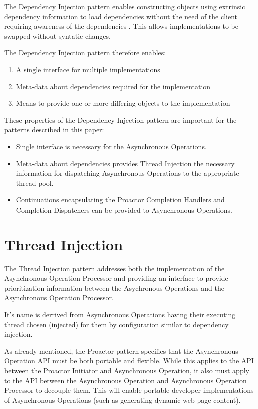 \documentclass{article}
\begin{document}
The Dependency Injection pattern enables constructing objects using extrinsic
dependency information to load dependencies without the need of the client
requiring awareness of the dependencies \cite{ioc}.  This allows implementations
to be swapped without syntatic changes.

The Dependency Injection pattern therefore enables:
\begin{enumerate}
  \item A single interface for multiple implementations
  \item Meta-data about dependencies required for the implementation
  \item Means to provide one or more differing objects to the implementation
\end{enumerate}

These properties of the Dependency Injection pattern are important for the
patterns described in this paper:
\begin{itemize}
  \item Single interface is necessary for the Asynchronous Operations.
  \item Meta-data about dependencies provides Thread Injection the necessary information for dispatching Asynchronous Operations to the appropriate thread pool.
  \item Continuations encapsulating the Proactor Completion Handlers and Completion Dispatchers can be provided to Asynchronous Operations.
\end{itemize}

\section{Thread Injection}

The Thread Injection pattern addresses both the implementation of the
Asynchronous Operation Processor and providing an interface to provide
prioritization information between the Asychronous Operations and the
Asynchronous Operation Processor.

It's name is derrived from Asynchronous Operations having their executing thread
chosen (injected) for them by configuration similar to dependency injection.

As already mentioned, the Proactor pattern specifies that the Asynchronous
Operation API must be both portable and flexible.  While this applies to the API
between the Proactor Initiator and Asynchronous Operation, it also must apply to
the API between the Asynchronous Operation and Asynchronous Operation Processor
to decouple them.  This will enable portable developer implementations of
Asynchronous Operations (such as generating dynamic web page content). 
\end{document}
